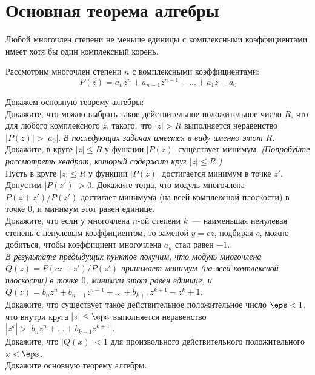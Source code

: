 

\section*{Основная теорема алгебры}


\theorem
Любой многочлен степени не меньше единицы с комплексными коэффициентами имеет
хотя бы один комплексный корень.

Рассмотрим многочлен степени $n$ с комплексными коэффициентами:
\[
    P(z)
=
    a_n z^n + a_{n-1} z^{n-1} + \ldots + a_1 z + a_0
\]

\begin{problems}

\item
Докажем основную теорему алгебры:
\\
\sbp
Докажите, что можно выбрать такое действительное положительное число $R$, что
для любого комплексного $z$, такого, что $|z| > R$ выполняется неравенство
$|P(z)| > |a_0|$.
\emph{В последующих задачах имеется в виду именно этот $R$.}
\\
\sbp
Докажите, в круге $|z| \leq R$ у функции $|P(z)|$ существует минимум.
\emph{(Попробуйте рассмотреть квадрат, который содержит круг $|z| \leq R$.)}
\\
\sbp
Пусть в круге $|z| \leq R$ у функции $|P(z)|$ достигается минимум в точке $z'$.
Допустим $|P(z')| > 0$.
Докажите тогда, что модуль многочлена $P(z+z') / P(z')$ достигает минимума
(на всей комплексной плоскости) в точке $0$, и минимум этот равен единице.
\\
\sbp
Докажите, что если у многочлена $n$-ой степени $k$~--- наименьшая ненулевая
степень с ненулевым коэффициентом, то заменой $y = c z$, подбирая $c$, можно
добиться, чтобы коэффициент многочлена $a_k$ стал равен $-1$.
\\\emph{В результате предыдущих пунктов получим, что модуль многочлена
$Q(z) = P(c z + z') / P(z')$ принимает минимум (на всей комплексной плоскости)
в точке $0$, минимум этот равен единице, и
\(
    Q(z)
=
    b_n z^n + b_{n-1} z^{n-1} + \ldots + b_{k+1} z^{k+1} - z^k + 1
\).}
\\
\sbp
Докажите, что существует такое действительное положительное число
$\eps < 1$, что внутри круга $|z| \leq \eps$ выполняется неравенство
$|z^k| > |b_n z^n + \ldots + b_{k+1} z^{k+1}|$.
\\
\sbp
Докажите, что $|Q(x)| < 1$ для произвольного действительного положительного
$x < \eps$.
\\
\sbp
Докажите основную теорему алгебры.


\end{problems}
